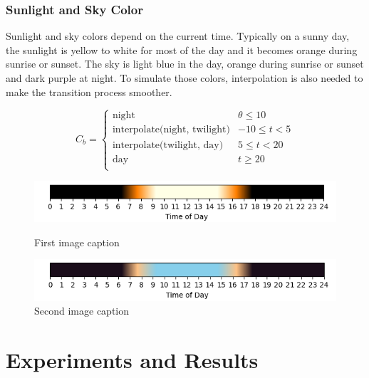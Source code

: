\documentclass{article}
\begin{document}
\begin{itemize}

\subsubsection {Sunlight and Sky Color}
Sunlight and sky colors depend on the current time. Typically on a sunny day, the sunlight is yellow
to white for most of the day and it becomes orange during sunrise or sunset. The sky is light blue
in the day, orange during sunrise or sunset and dark purple at night. To simulate those colors, 
interpolation is also needed to make the transition process smoother. 

\[
  C_{b}=
  \left\{
    \begin{array}{ll}
      \text{night} & \theta \leq 10 \\
      \text{interpolate(night, twilight)} &  -10 \leq t < 5 \\
      \text{interpolate(twilight, day)} &  5 \leq t < 20 \\
      \text{day} & t \geq 20 \\
    \end{array} 
  \right. 
\]




\begin{figure}[h]
  \centering
  \begin{minipage}{0.45\textwidth}
      \centering
      \includegraphics[width=\textwidth]{images/SunColor35N.png}
      \caption{First image caption}
      \label{fig:SunColor35N}
  \end{minipage}\hfill
  \begin{minipage}{0.45\textwidth}
      \centering
      \includegraphics[width=\textwidth]{images/SkyColor35N.png}
      \caption{Second image caption}
      \label{fig:SkyColor35N}
  \end{minipage}
\end{figure}


\section{Experiments and Results}


\end{itemize}
\end{document}
